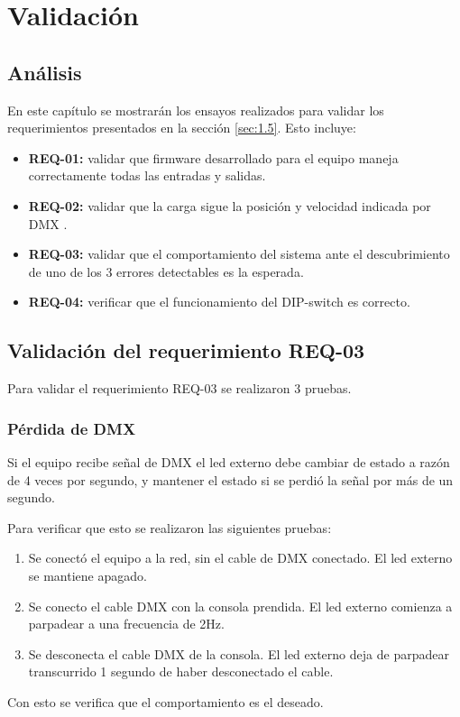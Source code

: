 \chapter{Validación}
\thispagestyle{empty}

\section{Análisis} \label{sec:\thesection}
En este capítulo se mostrarán los ensayos realizados para validar los requerimientos presentados en la sección \ref{sec:1.5}. Esto incluye:
\begin{itemize}
	\item \textbf{REQ-01:} validar que firmware desarrollado para el equipo maneja correctamente todas las entradas y salidas.
	\item \textbf{REQ-02:} validar que la carga sigue la posición y velocidad indicada por DMX .
	\item \textbf{REQ-03:} validar que el comportamiento del sistema ante el descubrimiento de uno de los 3 errores detectables es la esperada. 
	\item \textbf{REQ-04:} verificar que el funcionamiento del DIP-switch es correcto.
\end{itemize}

\section{Validación del requerimiento REQ-03} \label{sec:\thesection}
Para validar el requerimiento REQ-03 se realizaron 3 pruebas.
\subsection{Pérdida de DMX}
Si el equipo recibe señal de DMX el led externo debe cambiar de estado a razón de 4 veces por segundo, y mantener el estado si se perdió la señal por más de un segundo.

Para verificar que esto se realizaron las siguientes pruebas:
\begin{enumerate}
	\item Se conectó el equipo a la red, sin el cable de DMX conectado. El led externo se mantiene apagado.
	\item Se conecto el cable DMX con la consola prendida. El led externo comienza a parpadear a una frecuencia de 2Hz.
	\item Se desconecta el cable DMX de la consola. El led externo deja de parpadear transcurrido 1 segundo de haber desconectado el cable.
\end{enumerate}
Con esto se verifica que el comportamiento es el deseado.	
	 
